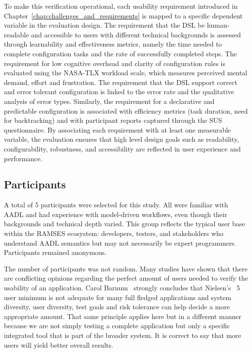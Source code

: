 To make this verification operational, each usability requirement introduced in Chapter~\ref{chap:challenges_and_requirements} is mapped to a specific dependent variable in the evaluation design. The requirement that the \gls{DSL} be human-readable and accessible to users with different technical backgrounds is assessed through learnability and effectiveness metrics, namely the time needed to complete configuration tasks and the rate of successfully completed steps. The requirement for low cognitive overhead and clarity of configuration rules is evaluated using the NASA-\gls{TLX} workload scale, which measures perceived mental demand, effort and frustration. The requirement that the \gls{DSL} support correct and error tolerant configuration is linked to the error rate and the qualitative analysis of error types. Similarly, the requirement for a declarative and predictable configuration is associated with efficiency metrics (task duration, need for backtracking) and with participant reports captured through the \gls{SUS} questionnaire. By associating each requirement with at least one measurable variable, the evaluation ensures that high level design goals such as readability, configurability, robustness, and accessibility are reflected in user experience and performance.


\subsection{Participants}
\label{sec:test_usabl_participants}

A total of 5 participants were selected for this study. All were familiar with \gls{AADL} and had experience with model-driven workflows, even though their backgrounds and technical depth varied. This group reflects the typical user base within the RAMSES ecosystem: developers, testers, and stakeholders who understand AADL semantics but may not necessarily be expert programmers. Participants remained anonymous.

The number of participants was not random. Many studies have shown that there are conflicting opinions regarding the perfect amount of users needed to verify the usability of an application. Carol Barnum~\cite{Barnum_2003} strongly concludes that Nielsen's~\cite{Nielsen_2024} 5 user minimum is not adequate for many full fledged applications and system diversity, user diversity, test goals and risk tolerance can help decide a more appropriate amount. That same principle applies here but in a different manner because we are not simply testing a complete application but only a specific integrated tool that is part of the broader system. It is correct to say that more users will yield better overall results.

